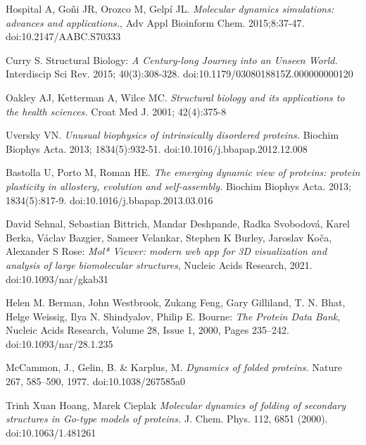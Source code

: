 \documentclass[licencjacka,en]{pracamgr}
\begin{document}
\tableofcontents












\appendix

\begin{thebibliography}{99}

 Hospital A, Goñi JR, Orozco M, Gelpí JL. \textit{Molecular dynamics simulations: advances and applications.}, Adv Appl Bioinform Chem. 2015;8:37-47. doi:10.2147/AABC.S70333

 Curry S. Structural Biology: \textit{A Century-long Journey into an Unseen World.} Interdiscip Sci Rev. 2015; 40(3):308-328. doi:10.1179/0308018815Z.000000000120

 Oakley AJ, Ketterman A, Wilce MC. \textit{Structural biology and its applications to the health sciences.} Croat Med J. 2001; 42(4):375-8

 Uversky VN. \textit{Unusual biophysics of intrinsically disordered proteins.} Biochim Biophys Acta. 2013; 1834(5):932-51. doi:10.1016/j.bbapap.2012.12.008

 Bastolla U, Porto M, Roman HE. \textit{The emerging dynamic view of proteins: protein plasticity in allostery, evolution and self-assembly.} Biochim Biophys Acta. 2013; 1834(5):817-9. doi:10.1016/j.bbapap.2013.03.016

 David Sehnal, Sebastian Bittrich, Mandar Deshpande, Radka Svobodová, Karel Berka, Václav Bazgier, Sameer Velankar, Stephen K Burley, Jaroslav Koča, Alexander S Rose: \textit{Mol* Viewer: modern web app for 3D visualization and analysis of large biomolecular structures}, Nucleic Acids Research, 2021. doi:10.1093/nar/gkab31

 Helen M. Berman, John Westbrook, Zukang Feng, Gary Gilliland, T. N. Bhat, Helge Weissig, Ilya N. Shindyalov, Philip E. Bourne: \textit{The Protein Data Bank}, Nucleic Acids Research, Volume 28, Issue 1, 2000, Pages 235–242. doi:10.1093/nar/28.1.235

 McCammon, J., Gelin, B. \& Karplus, M. \textit{Dynamics of folded proteins.} Nature 267, 585–590, 1977. doi:10.1038/267585a0

 Trinh Xuan Hoang, Marek Cieplak \textit{Molecular dynamics of folding of secondary structures in Go-type models of proteins.} J. Chem. Phys. 112, 6851 (2000). doi:10.1063/1.481261


\end{thebibliography}
\end{document}

